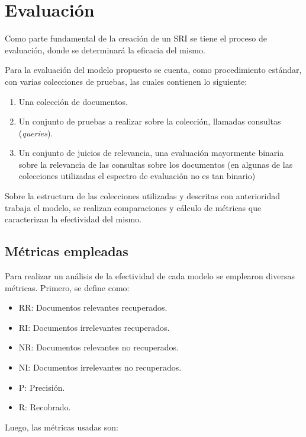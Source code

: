 \section{Evaluación}\label{sec:eval}

Como parte fundamental de la creación de un SRI se tiene el proceso de
evaluación, donde se determinará la eficacia del mismo. \cite{paik, manning}

Para la evaluación del modelo propuesto se cuenta, como procedimiento estándar,
con varias colecciones de pruebas, las cuales contienen lo siguiente:

\begin{enumerate}
    \item Una colección de documentos.
    \item Un conjunto de pruebas a realizar sobre la colección, llamadas
    consultas (\emph{queries}).
    \item Un conjunto de juicios de relevancia, una evaluación mayormente
    binaria sobre la relevancia de las consultas sobre los documentos (en
    algunas de las colecciones utilizadas el espectro de evaluación no es tan
    binario) 
\end{enumerate}

Sobre la estructura de las colecciones utilizadas y descritas con anterioridad
trabaja el modelo, se realizan comparaciones y cálculo de métricas que
caracterizan la efectividad del mismo. \cite{aizawa}

\subsection{Métricas empleadas}\label{sec:metrics}

Para realizar un análisis de la efectividad de cada modelo se emplearon 
diversas métricas. Primero, se define como:

\begin{itemize}
	\item RR: Documentos relevantes recuperados.
	\item RI: Documentos irrelevantes recuperados.
	\item NR: Documentos relevantes no recuperados.
	\item NI: Documentos irrelevantes no recuperados.
	\item P: Precisión.
	\item R: Recobrado.
\end{itemize}

Luego, las métricas usadas son:

